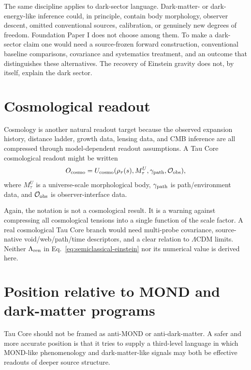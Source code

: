 \documentclass[11pt]{article}
\newcommand{\Rmap}{\rho_{\tau}}
\newcommand{\Mta}{M_{\tau}}
\begin{document}
The same discipline applies to dark-sector language.  Dark-matter- or
dark-energy-like inference could, in principle, contain body morphology,
observer descent, omitted conventional sources, calibration, or genuinely new
degrees of freedom.  Foundation Paper I does not choose among them.  To make a
dark-sector claim one would need a source-frozen forward construction,
conventional baseline comparisons, covariance and systematics treatment, and
an outcome that distinguishes these alternatives.  The recovery of Einstein
gravity does not, by itself, explain the dark sector.

\section{Cosmological readout}

Cosmology is another natural readout target because the observed expansion
history, distance ladder, growth data, lensing data, and CMB inference are all
compressed through model-dependent readout assumptions.  A Tau Core
cosmological readout might be written
\begin{equation}
  O_{\rm cosmo}
  =
  U_{\rm cosmo}(\Rmap(s),\Mta^U,\gamma_{\rm path},\mathcal O_{\rm obs}),
\end{equation}
where \(\Mta^U\) is a universe-scale morphological body, \(\gamma_{\rm path}\)
is path/environment data, and \(\mathcal O_{\rm obs}\) is observer-interface
data.

Again, the notation is not a cosmological result.  It is a warning against
compressing all cosmological tensions into a single function of the scale
factor.  A real cosmological Tau Core branch would need multi-probe covariance,
source-native void/web/path/time descriptors, and a clear relation to
\(\Lambda\)CDM limits.  Neither \(\Lambda_{\rm ren}\) in
Eq.~\eqref{eq:semiclassical-einstein} nor its numerical value is derived here.

\section{Position relative to MOND and dark-matter programs}

Tau Core should not be framed as anti-MOND or anti-dark-matter.  A safer and
more accurate position is that it tries to supply a third-level language in
which MOND-like phenomenology and dark-matter-like signals may both be
effective readouts of deeper source structure.
\end{document}
